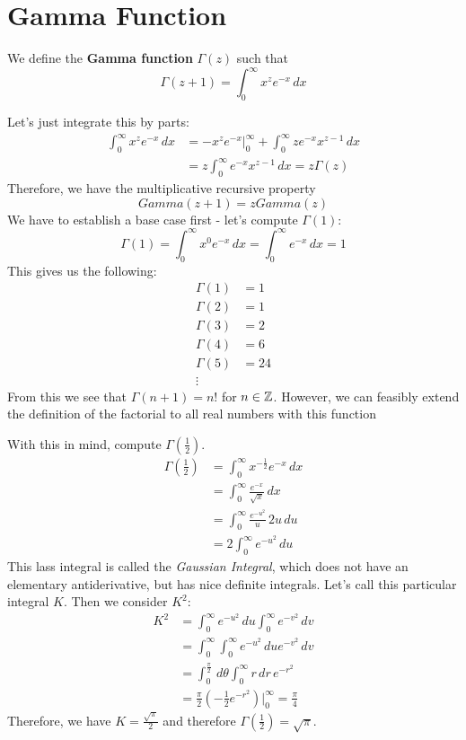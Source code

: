 \documentclass[11pt,twosided]{article}
\begin{document}
\section{Gamma Function}
\begin{definition} We define the \textbf{Gamma function} $\Gamma(z)$ such that
\[\Gamma(z+1) = \int_0^\infty x^z e^{-x} \, dx \]
\end{definition}
Let's just integrate this by parts: 
\begin{align*}
\int_0^\infty x^z e^{-x} \, dx &= -x^ze^{-x}\Big|_0^\infty + \int_0^\infty ze^{-x}x^{z-1} \, dx \\
&= z \int_0^\infty e^{-x}x^{z-1} \, dx = z \Gamma(z)
\end{align*}
Therefore, we have the multiplicative recursive property 
\[
	Gamma(z+1) = z Gamma(z)
\]
We have to establish a base case first - let's compute $\Gamma(1)$: 
\[
	\Gamma(1) = \int_0^\infty x^0 e^{-x} \, dx = \int_0^\infty e^{-x} \, dx = 1 
\]
This gives us the following: 
\begin{align*}
	\Gamma(1) &= 1 \\
	\Gamma(2) &= 1 \\
	\Gamma(3) &= 2 \\
	\Gamma(4) &= 6 \\
	\Gamma(5) &= 24 \\
	\vdots
\end{align*}
From this we see that $\Gamma(n+1) = n!$ for $n \in \mathbb Z$. However, we can feasibly extend the definition of the factorial to all real numbers with this function 

With this in mind, compute $\Gamma(\tfrac{1}{2})$. 
\begin{align*}
	\Gamma(\tfrac{1}{2}) &= \int_0^\infty x^{-\tfrac{1}{2}} e^{-x} \, dx \\
	&= \int_0^\infty \frac{e^{-x}}{\sqrt{x}} \, dx \\
	&= \int_0^\infty \frac{e^{-u^2}}{u} \, 2u \, du \\
	&= 2 \int_0^\infty e^{-u^2} \, du
\end{align*}
This lass integral is called the \textit{Gaussian Integral}, which does not have an elementary antiderivative, but has nice definite integrals. Let's call this particular integral $K$.
Then we consider $K^2$: 
\begin{align*}
K^2 &= \int_0^\infty e^{-u^2} \, du \int_0^\infty e^{-v^2} \, dv \\
&= \int_0^\infty \int_0^\infty e^{-u^2} \, du  e^{-v^2} \, dv \\
&= \int_0^{\frac{\pi}{2}} \, d\theta \int_0^\infty r\, dr \, e^{-r^2} \\
&= \frac{\pi}{2} \left(-\frac{1}{2} e^{-r^2} \right)\Big|_0^\infty = \frac{\pi}{4}
\end{align*}
Therefore, we have $K = \frac{\sqrt{\pi}}{2}$ and therefore $\Gamma(\tfrac{1}{2}) = \sqrt{\pi}$. 
	
\end{document}
